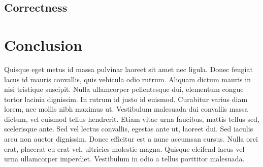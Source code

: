 \documentclass[conference]{IEEEtran}
\begin{document}
\subsection{Correctness}


\section{Conclusion}

Quisque eget metus id massa pulvinar laoreet sit amet nec ligula. Donec feugiat lacus id mauris convallis, quis vehicula odio rutrum. Aliquam dictum mauris in nisi tristique suscipit. Nulla ullamcorper pellentesque dui, elementum congue tortor lacinia dignissim. In rutrum id justo id euismod. Curabitur varius diam lorem, nec mollis nibh maximus ut. Vestibulum malesuada dui convallis massa dictum, vel euismod tellus hendrerit. Etiam vitae urna faucibus, mattis tellus sed, scelerisque ante. Sed vel lectus convallis, egestas ante ut, laoreet dui. Sed iaculis arcu non auctor dignissim. Donec efficitur est a nunc accumsan cursus. Nulla orci erat, placerat eu erat vel, ultricies molestie magna. Quisque eleifend lacus vel urna ullamcorper imperdiet. Vestibulum in odio a tellus porttitor malesuada.



\end{document}

